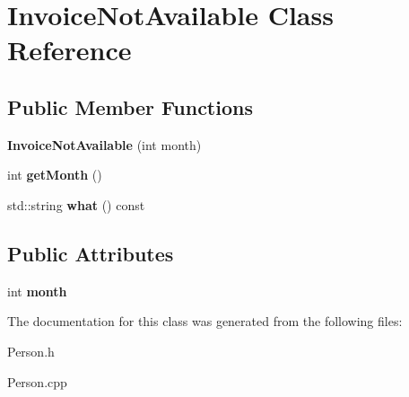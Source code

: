\hypertarget{class_invoice_not_available}{}\section{Invoice\+Not\+Available Class Reference}
\label{class_invoice_not_available}
\subsection*{Public Member Functions}
\begin{DoxyCompactItemize}
\item 
\mbox{\label{class_invoice_not_available_ad8821a4be3e8d48aef9dcd971cc9e0d0}} 
{\bfseries Invoice\+Not\+Available} (int month)
\item 
\mbox{\label{class_invoice_not_available_aba76622dae4202950c43956f6ed0930e}} 
int {\bfseries get\+Month} ()
\item 
\mbox{\label{class_invoice_not_available_a77e49a07e8605a37f1a4c6c59742b898}} 
std\+::string {\bfseries what} () const
\end{DoxyCompactItemize}
\subsection*{Public Attributes}
\begin{DoxyCompactItemize}
\item 
\mbox{\label{class_invoice_not_available_a35029f0aa54b16c927f45adbac81f427}} 
int {\bfseries month}
\end{DoxyCompactItemize}


The documentation for this class was generated from the following files\+:\begin{DoxyCompactItemize}
\item 
Person.\+h\item 
Person.\+cpp\end{DoxyCompactItemize}
